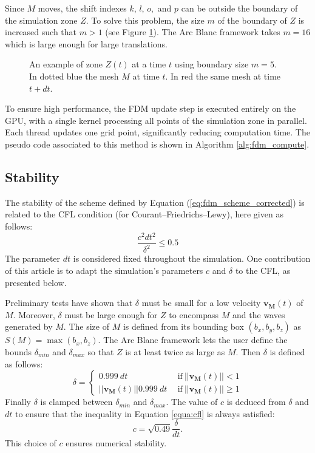 \documentclass[final]{jcgt}
\def\Framework{The Arc Blanc framework\xspace}
\begin{document}
Since $M$ moves, the shift indexes $k$, $l$, $o,$ and $p$ can be outside the boundary of the simulation zone $Z$.
To solve this problem, the size $m$ of the boundary of $Z$ is increased such that $m>1$ (see Figure \ref{fig:examGrid}).
\Framework takes $m=16$ which is large enough for large translations.

\begin{figure}[!h]
	\centering
	
	\caption{An example of zone $Z(t)$ at a time $t$ using boundary size $m=5$.
		In \textcolor{bleuF}{dotted blue} the mesh ${M}$ at time $t$.
		In \textcolor{redF}{red} the same mesh at time $t+dt$.}
	\label{fig:examGrid}
\end{figure}


To ensure high performance, the FDM update step is executed entirely on the GPU,
with a single kernel processing all points of the simulation zone in parallel.
Each thread updates one grid point, significantly reducing computation time. The pseudo code associated to this method is shown in Algorithm \ref{alg:fdm_compute}.



\subsection{Stability}
\label{subsec:stability}
The stability of the scheme defined by Equation (\ref{eq:fdm_scheme_corrected}) is related to the CFL condition (for Courant–Friedrichs–Lewy), here given as follows:
\begin{equation}
\label{equa:cfl}
	\frac{c^2dt^2}{\delta^2}\leq 0.5
\end{equation}
The parameter $dt$ is considered fixed throughout the simulation.
One contribution of this article is to adapt the simulation's parameters $c$ and $\delta$ to the CFL, as presented below.

Preliminary tests have shown that $\delta$ must be small for a low velocity $\mathbf{v_M}(t)$ of $M$.
Moreover, $\delta$ must be large enough for $Z$ to encompass $M$ and the waves generated by $M$.
The size of $M$ is defined from its bounding box $(b_x, b_y, b_z)$ as $S(M)=\max(b_x, b_z)$.
\Framework lets the user define the bounds $\delta_{min}$ and $\delta_{max}$ so that $Z$ is at least twice as large as $M$.
Then $\delta$ is defined as follows:
\begin{equation}
	\delta =
	\begin{cases}
		0.999~dt                    & ~~ \text{if}~||\mathbf{v_M}(t)||<1    \\
		||\mathbf{v_M}(t)||0.999~dt & ~~ \text{if}~||\mathbf{v_M}(t)||\geq1
	\end{cases}
\end{equation}
Finally $\delta$ is clamped between $\delta_{min}$ and $\delta_{max}$.
The value of $c$ is deduced from $\delta$ and $dt$ to ensure that the inequality in Equation \ref{equa:cfl} is always satisfied:
\begin{equation}
	c = \sqrt{0.49} \frac{\delta}{dt}.
\end{equation}
This choice of $c$ ensures numerical stability.
\end{document}
